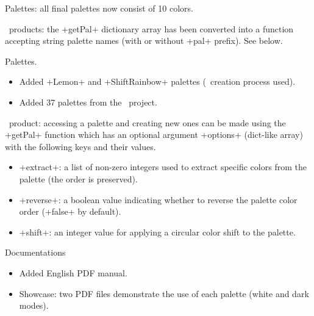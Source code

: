 \documentclass{tutodoc}
\begin{document}
\small

\begin{tdocbreak}
    \item Palettes: all final palettes now consist of 10 colors.


    \item \LUADRAW\ products: the +getPal+ dictionary array has been converted into a function accepting string palette names (with or without +pal+ prefix). See below.
\end{tdocbreak}




\begin{tdocnew}
    \item Palettes.
    \begin{itemize}
        \item Added  +Lemon+ and +ShiftRainbow+ palettes (\LUADRAW\ creation process used).

        \item Added 37 palettes from the \scicolmaps\ project.
    \end{itemize}


    \item \LUADRAW\ product: accessing a palette and creating new ones can be made using the +getPal+ function which has an optional argument +options+ (dict-like array) with the following keys and their values.
    \begin{itemize}
        \item {}+extract+: a list of non-zero integers used to extract specific colors from the palette (the order is preserved).

        \item {}+reverse+: a boolean value indicating whether to reverse the palette color order (+false+ by default).

        \item {}+shift+: an integer value for applying a circular color shift to the palette.
    \end{itemize}


    \item Documentations
    \begin{itemize}
        \item Added English PDF manual.

        \item Showcase: two PDF files demonstrate the use of each palette (white and dark modes).
    \end{itemize}
\end{tdocnew}
\end{document}
